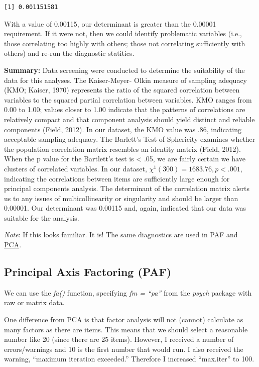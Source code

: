 \documentclass[
  english,
]{book}
\begin{document}
\begin{verbatim}
[1] 0.001151581
\end{verbatim}

With a value of 0.00115, our determinant is greater than the 0.00001 requirement. If it were not, then we could identify problematic variables (i.e., those correlating too highly with others; those not correlating sufficiently with others) and re-run the diagnostic statitics.

\textbf{Summary:} Data screening were conducted to determine the suitability of the data for this analyses. The Kaiser-Meyer- Olkin measure of sampling adequacy (KMO; Kaiser, 1970) represents the ratio of the squared correlation between variables to the squared partial correlation between variables. KMO ranges from 0.00 to 1.00; values closer to 1.00 indicate that the patterns of correlations are relatively compact and that component analysis should yield distinct and reliable components (Field, 2012). In our dataset, the KMO value was .86, indicating acceptable sampling adequacy. The Barlett's Test of Sphericity examines whether the population correlation matrix resembles an identity matrix (Field, 2012). When the p value for the Bartlett's test is \textless{} .05, we are fairly certain we have clusters of correlated variables. In our dataset, \(\chi ^{1}(300)=1683.76, p < .001\), indicating the correlations between items are sufficiently large enough for principal components analysis. The determinant of the correlation matrix alerts us to any issues of multicollinearity or singularity and should be larger than 0.00001. Our determinant was 0.00115 and, again, indicated that our data was suitable for the analysis.

\emph{Note}: If this looks familiar. It is! The same diagnostics are used in PAF and \protect\hyperlink{PCA}{PCA}.

\hypertarget{principal-axis-factoring-paf}{%
\subsection{Principal Axis Factoring (PAF)}\label{principal-axis-factoring-paf}}

We can use the \emph{fa()} function, specifying \emph{fm = ``pa''} from the \emph{psych} package with raw or matrix data.

One difference from PCA is that factor analysis will not (cannot) calculate as many factors as there are items. This means that we should select a reasonable number like 20 (since there are 25 items). However, I received a number of errors/warnings and 10 is the first number that would run. I also received the warning, ``maximum iteration exceeded.'' Therefore I increased ``max.iter'' to 100.
\end{document}
